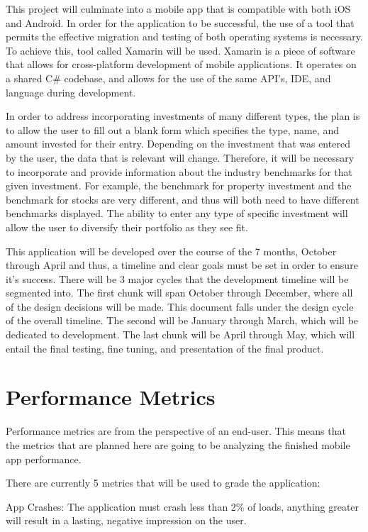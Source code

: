 \documentclass[onecolumn, draftclsnofoot,10pt, compsoc]{IEEEtran}
\begin{document}
This project will culminate into a mobile app that is compatible with both iOS and Android. In order for the application to be successful, the use of a tool that permits the effective migration and testing of both operating systems is necessary. To achieve this, tool called Xamarin will be used. Xamarin is a piece of software that allows for cross-platform development of mobile applications. It operates on a shared C\# codebase, and allows for the use of the same API’s, IDE, and language during development. 

In order to address incorporating investments of many different types, the plan is to allow the user to fill out a blank form which specifies the type, name, and amount invested for their entry. Depending on the investment that was entered by the user, the data that is relevant will change. Therefore, it will be necessary to incorporate and provide information about the industry benchmarks for that given investment. For example, the benchmark for property investment and the benchmark for stocks are very different, and thus will both need to have different benchmarks displayed. The ability to enter any type of specific investment will allow the user to diversify their portfolio as they see fit.

This application will be developed over the course of the 7 months, October through April and thus, a timeline and clear goals must be set in order to ensure it’s success. There will be 3 major cycles that the development timeline will be segmented into. The first chunk will span October through December, where all of the design decisions will be made. This document falls under the design cycle of the overall timeline. The second will be January through March, which will be dedicated to development. The last chunk will be April through May, which will entail the final testing,  fine tuning, and presentation of the final product.

\section{Performance Metrics}
Performance metrics are from the perspective of an end-user. This means that the metrics that are planned here are  going to be analyzing the finished mobile app performance. 

There are currently 5 metrics that will be used to grade the application:

	App Crashes:  The application must crash less than 2\% of loads, anything greater will result in a lasting, negative impression on the user.
	
\end{document}
